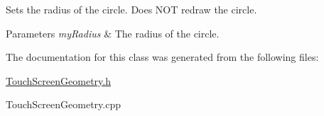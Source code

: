 Sets the radius of the circle. Does N\+O\+T redraw the circle. 


\begin{DoxyParams}{Parameters}
{\em my\+Radius} & The radius of the circle. \\
\hline
\end{DoxyParams}


The documentation for this class was generated from the following files\+:\begin{DoxyCompactItemize}
\item 
\hyperlink{_touch_screen_geometry_8h}{Touch\+Screen\+Geometry.\+h}\item 
Touch\+Screen\+Geometry.\+cpp\end{DoxyCompactItemize}
